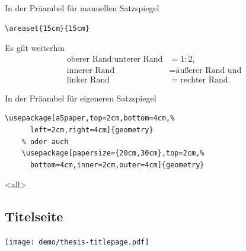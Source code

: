 \begin{Block}{In der Präambel für manuellen Satzspiegel}
  \begin{lstlisting}[gobble=4,style=block]
    \areaset{15cm}{15cm}
  \end{lstlisting}
  Es gilt weiterhin
  \begin{align*}
    \text{oberer\ Rand} : \text{unterer\ Rand} &= 1 : 2, \\
    \text{innerer\ Rand} &= \text{äußerer\ Rand} \text{ und} \\
    \text{linker\ Rand} &= \text{rechter\ Rand}.
  \end{align*}
\end{Block}

\begin{Block}{In der Präambel für eigeneren Satzspiegel}
  \begin{lstlisting}[gobble=4,style=block]
    \usepackage[a5paper,top=2cm,bottom=4cm,%
      left=2cm,right=4cm]{geometry}
    % oder auch
    \usepackage[papersize={20cm,30cm},top=2cm,%
      bottom=4cm,inner=2cm,outer=4cm]{geometry}
  \end{lstlisting}
\end{Block}

\mode
<all>

\subsection{Titelseite}

\begin{Frame}
  \begin{center}
  \end{center}
\end{Frame}

\begin{Frame}
  \begin{center}
    \texttt{[image: demo/thesis-titlepage.pdf]}
  \end{center}
\end{Frame}


